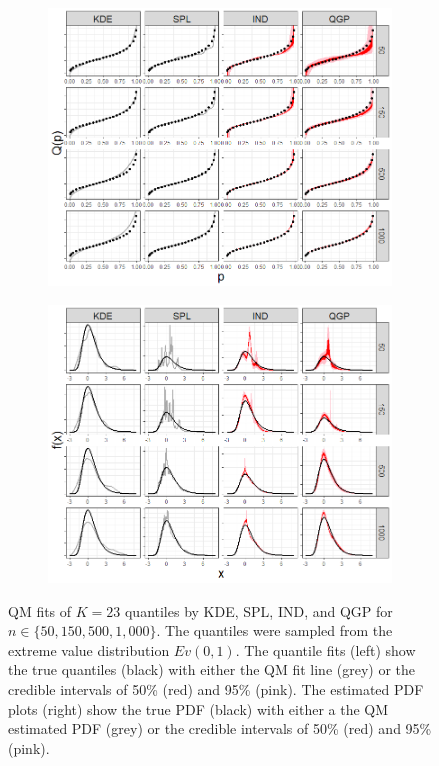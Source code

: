 \documentclass[preprint,12pt,authoryear]{elsarticle}
\begin{document}
\begin{figure}
\centering
\begin{subfigure}{.5\textwidth}
  \centering
  \includegraphics[width=.95\linewidth]{Images/quants_evd.png}
\end{subfigure}%
\begin{subfigure}{.5\textwidth}
  \centering
  \includegraphics[width=.95\linewidth]{Images/dens_evd.png}
\end{subfigure}
\caption{QM fits of $K=23$ quantiles by KDE, SPL, IND, and QGP for $n \in \{50, 150, 500, 1{,}000\}$. The quantiles were sampled from the extreme value distribution $Ev(0,1)$. The quantile fits (left) show the true quantiles (black) with either the QM fit line (grey) or the credible intervals of 50\% (red) and 95\% (pink). 
The estimated PDF plots (right) show the true PDF (black) with either a the QM estimated PDF (grey) or the credible intervals of 50\% (red) and 95\% (pink).}
\label{fig:evd_fits}
\end{figure}
\end{document}
